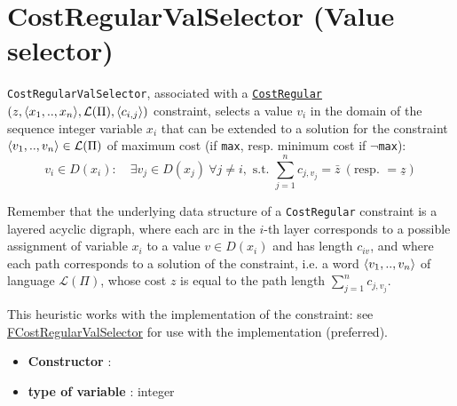 \section{CostRegularValSelector (Value selector)}\label{costregularvalselector:costregularvalselectorvalselector}\hypertarget{costregularvalselector:costregularvalselectorvalselector}{}
\begin{notedef}
  \texttt{CostRegularValSelector}, associated with a \hyperlink{costregular:costregularconstraint}{\texttt{CostRegular}}$(z, \langle x_1,..,x_n\rangle,\mathcal{L}(\Pi), \langle c_{i,j}\rangle)$ constraint, selects a value $v_i$ in the domain of the sequence integer variable $x_i$ that can be extended to a solution for the constraint $\langle v_1,..,v_n\rangle\in\mathcal{L}(\Pi)$ of maximum cost (if \texttt{max}, resp. minimum cost if $\neg$\texttt{max}):
$$ v_i\in D(x_i):\quad \exists v_j\in D(x_j)\ \forall j\neq i, \text{ s.t. } \sum_{j=1}^n c_{j,v_j} = \bar{z}\ (\text{resp. } =\underline{z})$$   
\end{notedef}
Remember that the underlying data structure of a \texttt{CostRegular} constraint is a layered acyclic digraph, where each arc in the $i$-th layer corresponds to a possible assignment of variable $x_i$ to a value $v\in D(x_i)$ and has length $c_{iv}$, and where each path corresponds to a solution of the constraint, i.e. a word $\langle v_1,..,v_n\rangle$ of language $\mathcal{L}(\Pi)$, whose cost $z$ is equal to the path length $\sum_{j=1}^n c_{j,v_j}$.

This heuristic works with the  implementation of the constraint: see \hyperlink{fcostregularvalselector:fcostregularvalselectorvalselector}{FCostRegularValSelector} for use with the  implementation (preferred).

\begin{itemize}
	\item \textbf{Constructor} : 
	\item \textbf{type of variable} : integer
\end{itemize}

%

